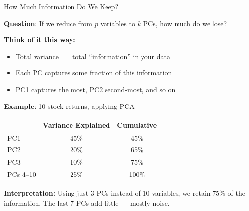 \documentclass[10pt]{beamer}
\begin{document}
\begin{frame}{How Much Information Do We Keep?}

  \textbf{Question:} If we reduce from $p$ variables to $k$ PCs, how much do we lose?

  \vspace{1em}
  \textbf{Think of it this way:}
  \begin{itemize}
    \item Total variance $=$ total ``information'' in your data
    \item Each PC captures some fraction of this information
    \item PC1 captures the most, PC2 second-most, and so on
  \end{itemize}

  \vspace{1em}
  \textbf{Example:} 10 stock returns, applying PCA

 \vspace{0.3em}
  \begin{center}
  \begin{tabular}{lcc}
    \toprule
    & \textbf{Variance Explained} & \textbf{Cumulative} \\
    \midrule
    PC1 & 45\% & 45\% \\
    PC2 & 20\% & 65\% \\
    PC3 & 10\% & 75\% \\
    PCs 4--10 & 25\% & 100\% \\
    \bottomrule
  \end{tabular}
  \end{center}

  \vspace{0.5em}
 \textbf{Interpretation:} Using just 3 PCs instead of 10 variables, we retain 75\% of the information. The last 7 PCs add little --- mostly noise.
\end{frame}

\end{document}
